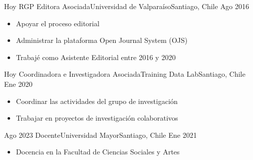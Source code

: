 





\begin{experiences}
  \experience
    {Hoy} {RGP Editora Asociada}{Universidad de Valparaíso}{Santiago, Chile} {Ago 2016}
    {\begin{itemize}
    \item Apoyar el proceso editorial
    \item Administrar la plataforma Open Journal System (OJS)
    \item Trabajé como Asistente Editorial entre 2016 y 2020
    \end{itemize}}
    {}
\end{experiences}
\vspace{-2mm}

\begin{experiences}
  \emptySeparator 
  \experience 
    {Hoy} {Coordinadora e Investigadora Asociada}{Training Data Lab}{Santiago, Chile} {Ene 2020}
    {\begin{itemize}
    \item Coordinar las actividades del grupo de investigación
    \item Trabajar en proyectos de investigación colaborativos
    \end{itemize}}
    {}
\end{experiences}
\vspace{-2mm}

\begin{experiences}
  \emptySeparator 
  \experience 
    {Ago 2023} {Docente}{Universidad Mayor}{Santiago, Chile} {Ene 2021}
    {\begin{itemize}
    \item Docencia en la Facultad de Ciencias Sociales y Artes
    \end{itemize}}
    {}
\end{experiences}
\vspace{-2mm}

